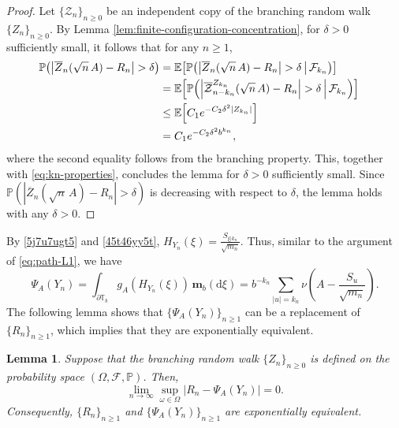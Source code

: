 \documentclass[a4paper, 11pt]{article}
\newcommand{\1}{\mathbf 1}
\theoremstyle{plain}
\newtheorem{lemma}[theorem]{Lemma}
\begin{document}
\begin{proof}Let $\{\mathcal{Z}_n\}_{n\geq0}$ be an independent copy of the branching random walk $\{{Z}_n\}_{n\geq0}$. By Lemma \ref{lem:finite-configuration-concentration}, for $\delta>0$ sufficiently
small, it follows that for any $n\geq1$,
\begin{align}
\mathbb{P}\!\left(
    \left|\overline Z_n(\sqrt n\,A)-R_n\right|>\delta
  \right)
  &=\mathbb{E}\!\left[\mathbb{P}\!\left(\left|\overline Z_n(\sqrt n\,A)-R_n\right|>\delta\,\middle|\,\mathcal{F}_{k_n}\right)\right]\cr
  &=\mathbb{E}\!\left[\mathbb{P}\!\left(\left|\overline {\mathcal{Z}}^{Z_{k_n}}_{n-k_n}(\sqrt n\,A)-R_n\right|>\delta\,\middle|\,\mathcal{F}_{k_n}\right)\right]\cr
  &\leq\mathbb{E}\!\left[C_1e^{-C_2\delta^2|Z_{k_n}|}\right]\cr
  &=C_1e^{-C_2\delta^2b^{k_n}},\nonumber
\end{align}
where the second equality follows from the branching property. This, together with \eqref{eq:kn-properties}, concludes the lemma for $\delta>0$ sufficiently small. Since $\mathbb{P}\!(|\overline Z_n(\sqrt n\,A)-R_n|>\delta)$ is decreasing with respect to $\delta$, the lemma holds with any $\delta>0$.
\end{proof}

By \eqref{5j7u7ugt5} and \eqref{45t46yy5t}, $H_{Y_n}(\xi)=\frac{S_{\xi|k_n}}{\sqrt{m_n}}$. Thus, similar to the argument of \eqref{eq:path-L1}, we have
\begin{equation}
  \Psi_A(Y_n)
  = \int_{\partial\mathbb{T}_b}g_A(H_{Y_n}(\xi))\,\mathbf m_b(\mathrm{d}\xi)=
  b^{-k_n}\sum_{|u|=k_n}
  \nu\!\left(A-\frac{S_u}{\sqrt{m_n}}\right).\nonumber
\end{equation}
The following lemma shows that $\{\Psi_A(Y_n)\}_{n\geq1}$ can be a replacement of $\{R_n\}_{n\geq1}$, which implies that they are exponentially
equivalent.
\begin{lemma}
\label{lem:kernel-replacement}
Suppose that the branching random walk $\{Z_{n}\}_{n\geq0}$ is defined on the probability space $(\Omega,\mathcal{F},\mathbb{P})$. Then,
\[
  \lim_{n\to\infty}\sup_{\omega\in \Omega}|R_n-\Psi_A(Y_n)|=0.
\]
Consequently, \(\{R_n\}_{n\geq1}\) and \(\{\Psi_A(Y_n)\}_{n\geq1}\) are exponentially equivalent.
\end{lemma}
\end{document}
